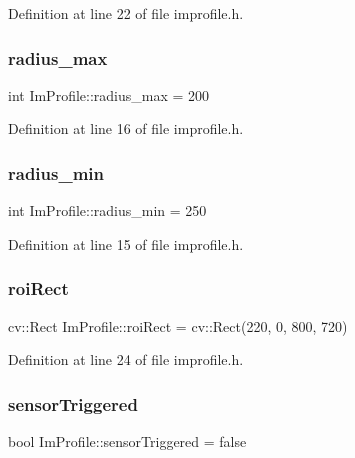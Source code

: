 Definition at line 22 of file improfile.\+h.

\mbox{\label{struct_im_profile_aca763d3940de1b731fb1dce4531593f5}} 
\subsubsection{\texorpdfstring{radius\+\_\+max}{radius\_max}}
{\footnotesize\ttfamily int Im\+Profile\+::radius\+\_\+max = 200}



Definition at line 16 of file improfile.\+h.

\mbox{\label{struct_im_profile_a6697334a9fbed69e58f11dd5464ae180}} 
\subsubsection{\texorpdfstring{radius\+\_\+min}{radius\_min}}
{\footnotesize\ttfamily int Im\+Profile\+::radius\+\_\+min = 250}



Definition at line 15 of file improfile.\+h.

\mbox{\label{struct_im_profile_ae0436a17c44ab16366c7addf288ec219}} 
\subsubsection{\texorpdfstring{roi\+Rect}{roiRect}}
{\footnotesize\ttfamily cv\+::\+Rect Im\+Profile\+::roi\+Rect = cv\+::\+Rect(220, 0, 800, 720)}



Definition at line 24 of file improfile.\+h.

\mbox{\label{struct_im_profile_ada7e3e46b79d71e0edcb85cc03d38a51}} 
\subsubsection{\texorpdfstring{sensor\+Triggered}{sensorTriggered}}
{\footnotesize\ttfamily bool Im\+Profile\+::sensor\+Triggered = false}



